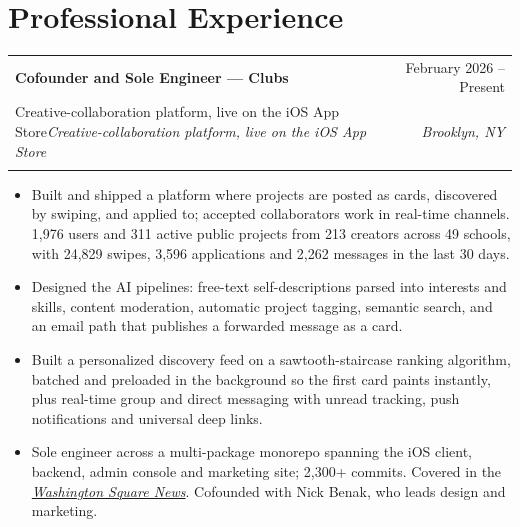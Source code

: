 \documentclass[10pt,letterpaper]{article}
\makeatletter
\newcommand{\entry}[4]{%
  \begin{tabularx}{\textwidth}{@{}X@{\hspace{8pt}}r@{}}
    \textbf{#1} & #2 \\
    \ifx\relax#3\relax\else \textit{#3} & \textit{#4} \\ \fi
  \end{tabularx}\vspace{1pt}}
\makeatother
\begin{document}
\section{Professional Experience}
\entry{Cofounder and Sole Engineer --- Clubs}{February 2026 -- Present}
  {Creative-collaboration platform, live on the iOS App Store}{Brooklyn, NY}
\begin{itemize}
  \item Built and shipped a platform where projects are posted as cards, discovered by swiping, and applied to;
  accepted collaborators work in real-time channels. 1,976 users and 311 active public projects from
  213 creators across 49 schools, with 24,829 swipes, 3,596 applications and 2,262 messages in the last 30 days.
  \item Designed the AI pipelines: free-text self-descriptions parsed into interests and skills, content
  moderation, automatic project tagging, semantic search, and an email path that publishes a forwarded
  message as a card.
  \item Built a personalized discovery feed on a sawtooth-staircase ranking algorithm, batched and preloaded in
  the background so the first card paints instantly, plus real-time group and direct messaging with unread
  tracking, push notifications and universal deep links.
  \item Sole engineer across a multi-package monorepo spanning the iOS client, backend, admin console and
  marketing site; 2,300+ commits. Covered in the
  \href{https://nyunews.com}{\textit{Washington Square News}}. Cofounded with Nick Benak, who leads design and marketing.
\end{itemize}
\end{document}
